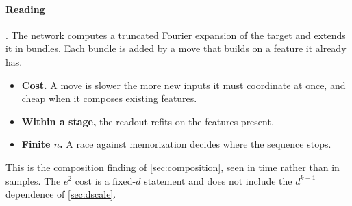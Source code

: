 \paragraph{Reading} . The network computes a truncated Fourier expansion of the target and extends it in bundles. Each bundle is added by a move that builds on a feature it already has.
\begin{itemize}
\item \textbf{Cost.} A move is slower the more new inputs it must coordinate at once, and cheap when it composes existing features.
\item \textbf{Within a stage,} the readout refits on the features present.
\item \textbf{Finite $n$.} A race against memorization decides where the sequence stops.
\end{itemize}
This is the composition finding of \cref{sec:composition}, seen in time rather than in samples. The $e^2$ cost is a fixed-$d$ statement and does not include the $d^{k-1}$ dependence of \cref{sec:dscale}.
